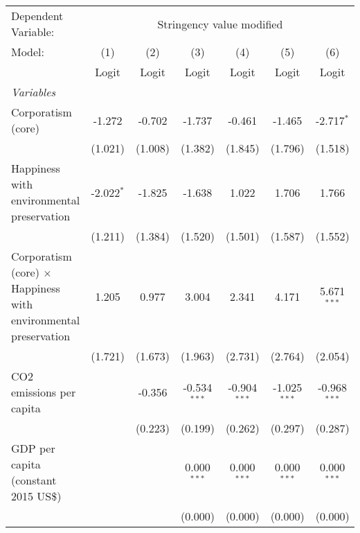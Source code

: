 
\begingroup
\centering
\begin{tabular}{lcccccc}
   \toprule
   Dependent Variable: & \multicolumn{6}{c}{Stringency value modified}\\
   Model:                                                                 & (1)          & (2)     & (3)            & (4)            & (5)            & (6)\\  
                                                                          &  Logit       & Logit   & Logit          & Logit          & Logit          & Logit\\  
   \midrule
   \emph{Variables}\\
   Corporatism (core)                                                     & -1.272       & -0.702  & -1.737         & -0.461         & -1.465         & -2.717$^{*}$\\   
                                                                          & (1.021)      & (1.008) & (1.382)        & (1.845)        & (1.796)        & (1.518)\\   
   Happiness with environmental preservation                              & -2.022$^{*}$ & -1.825  & -1.638         & 1.022          & 1.706          & 1.766\\   
                                                                          & (1.211)      & (1.384) & (1.520)        & (1.501)        & (1.587)        & (1.552)\\   
   Corporatism (core) $\times$ Happiness with environmental preservation  & 1.205        & 0.977   & 3.004          & 2.341          & 4.171          & 5.671$^{***}$\\   
                                                                          & (1.721)      & (1.673) & (1.963)        & (2.731)        & (2.764)        & (2.054)\\   
   CO2 emissions per capita                                               &              & -0.356  & -0.534$^{***}$ & -0.904$^{***}$ & -1.025$^{***}$ & -0.968$^{***}$\\   
                                                                          &              & (0.223) & (0.199)        & (0.262)        & (0.297)        & (0.287)\\   
   GDP per capita (constant 2015 US\$)                                    &              &         & 0.000$^{***}$  & 0.000$^{***}$  & 0.000$^{***}$  & 0.000$^{***}$\\   
                                                                          &              &         & (0.000)        & (0.000)        & (0.000)        & (0.000)\\   

\end{tabular}
